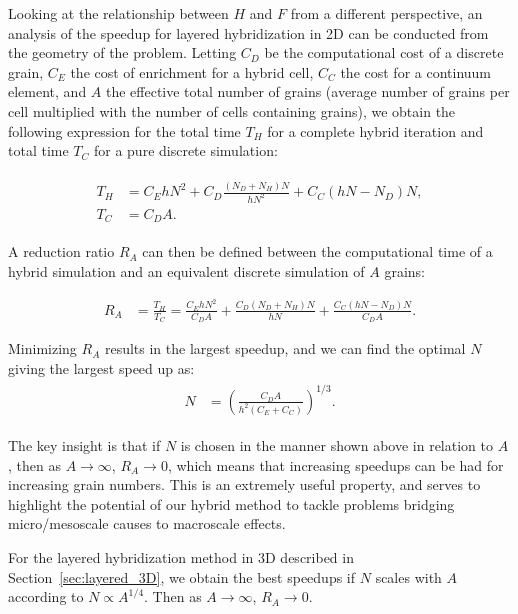 Looking at the relationship between $H$ and $F$ from a different perspective, an analysis of the speedup for layered hybridization in 2D can be conducted from the geometry of the problem. Letting $C_D$ be the computational cost
of a discrete grain, $C_E$ the cost of enrichment for a hybrid cell, $C_C$ the cost for a continuum element, and $A$ the effective total number of grains (average number of grains per 
cell multiplied with the number of cells containing grains), we obtain the following expression for the total time $T_H$ for a complete hybrid iteration and total time $T_C$ for a pure discrete simulation:

\begin{align}
\begin{aligned}
T_H &= C_EhN^2 +C_D\frac{(N_D+N_H)N}{hN^2}+C_C(hN-N_D)N , \\
T_C &= C_DA.
\end{aligned}
\end{align}

A reduction ratio $R_A$ can then be defined between the computational time of a hybrid simulation and an equivalent discrete simulation of $A$ grains:

\begin{align}
R_A &=\frac{T_H}{T_C}=\frac{C_E h N^2}{C_DA} +\frac{C_D (N_D+N_H)N}{hN}+\frac{C_C (hN-N_D)N}{C_DA}.
\end{align}

Minimizing $R_A$ results in the largest speedup, 
and we can find the optimal $N$ giving the largest speed up as:
\begin{align}
\begin{aligned}
N & = \left(\frac{C_DA}{h^2(C_E+C_C)}\right)^{1/3}.
\end{aligned}
\end{align}

The key insight is that if $N$ is chosen in the manner shown above in relation to $A$, then as $A\rightarrow\infty$, $R_A\rightarrow0$, which means that increasing speedups
can be had for increasing grain numbers. This is an extremely useful property, and serves to highlight the potential of our hybrid method to tackle problems bridging 
micro/mesoscale causes to macroscale effects. 

For the layered hybridization method in 3D described in Section~\ref{sec:layered_3D}, we obtain the best speedups if $N$ scales with $A$ according to $N \propto A^{1/4}$. Then as $A\rightarrow\infty$, $R_A\rightarrow0$.

